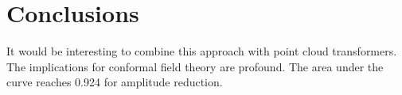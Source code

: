 \section{Conclusions}\label{sec:conclusions}

It would be interesting to combine this approach with point cloud
transformers. The implications for conformal field theory are profound.
The area under the curve reaches 0.924 for amplitude reduction.

